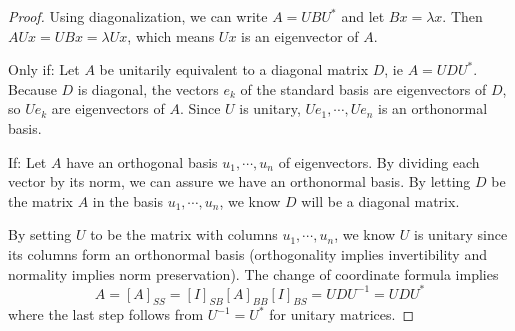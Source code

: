 \begin{proof}
Using diagonalization, we can write $A = UBU^{*}$ and let $Bx = \lambda x$. Then $AUx = UBx = \lambda Ux$, which means $Ux$ is an eigenvector of $A$. 

Only if: Let $A$ be unitarily equivalent to a diagonal matrix $D$, ie $A = UDU^{*}$. Because $D$ is diagonal, the vectors $e_{k}$ of the standard basis are eigenvectors of $D$, so $Ue_{k}$ are eigenvectors of $A$. Since $U$ is unitary, $Ue_{1}, \cdots, Ue_{n}$ is an orthonormal basis. 

If: Let $A$ have an orthogonal basis $u_{1}, \cdots, u_{n}$ of eigenvectors. By dividing each vector by its norm, we can assure we have an orthonormal basis. By letting $D$ be the matrix $A$ in the basis $u_{1}, \cdots, u_{n}$, we know $D$ will be a diagonal matrix. 

By setting $U$ to be the matrix with columns $u_{1}, \cdots, u_{n}$, we know $U$ is unitary since its columns form an orthonormal basis (orthogonality implies invertibility and normality implies norm preservation). The change of coordinate formula implies 
$$A = [A]_{SS} = [I]_{SB} [A]_{BB} [I]_{BS} = UDU^{-1} = UDU^{*}$$
where the last step follows from $U^{-1} = U^{*}$ for unitary matrices. 
\end{proof}

